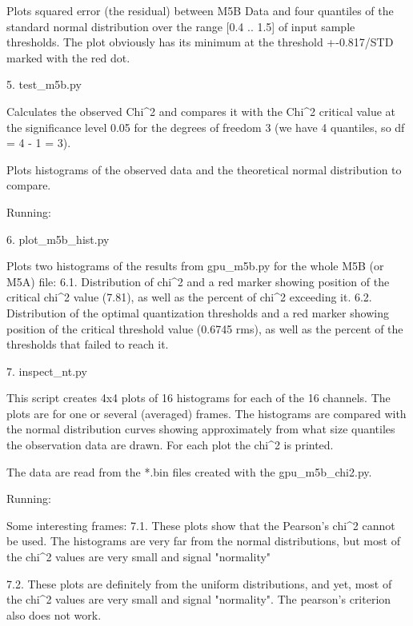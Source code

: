 \documentclass[letterpaper,twoside,12pt]{article}
\begin{document}
Plots squared error (the residual) between M5B Data and four quantiles of the
standard normal distribution over the range [0.4 .. 1.5] of input sample
thresholds. The plot obviously has its minimum at the threshold +-0.817/STD
marked with the red dot.


5. test_m5b.py

Calculates the observed Chi^2 and compares it with the Chi^2 critical value at
the significance level 0.05 for the degrees of freedom 3 (we have 4 quantiles,
so df = 4 - 1 = 3).

Plots histograms of the observed data and the theoretical normal distribution
to compare.

Running:


6. plot_m5b_hist.py

Plots two histograms of the results from gpu_m5b.py for the whole 
M5B (or M5A) file: 
6.1. Distribution of chi^2 and a red marker showing position of the critical
     chi^2 value (7.81), as well as the percent of chi^2 exceeding it.
6.2. Distribution of the optimal quantization thresholds and a red marker
     showing position of the critical threshold value (0.6745 rms), as well as
     the percent of the thresholds that failed to reach it.


7. inspect_nt.py

This script creates 4x4 plots of 16 histograms for each of the 16 channels.
The plots are for one or several (averaged) frames. The histograms are compared
with the normal distribution curves showing approximately from what size
quantiles the observation data are drawn. For each plot the chi^2 is printed.

The data are read from the *.bin files created with the gpu_m5b_chi2.py.

Running:


Some interesting frames:
7.1. These plots show that the Pearson's chi^2 cannot be used. The histograms 
are very far from the normal distributions, but most of the chi^2 values
are very small and signal "normality"

7.2. These plots are definitely from the uniform distributions, and yet, most
of the chi^2 values are very small and signal "normality". The pearson's
criterion also does not work.
\end{document}
